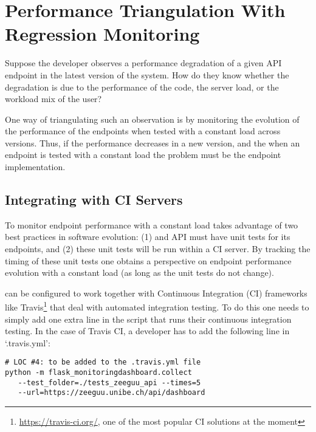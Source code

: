 


  \section{Performance Triangulation With Regression Monitoring}
  \label{sec:regression}

  Suppose the developer observes a performance degradation of a given API endpoint in the latest version of the system. How do they know whether the degradation is due to the performance of the code, the server load, or the workload mix of the user? 

  \vspace{0.1cm}

  
  One way of triangulating such an observation is by monitoring the evolution of the performance of the endpoints when tested with a constant load across versions. Thus, if the performance decreases in a new version, and the  when an endpoint is tested with a constant load the problem must be the endpoint implementation. 

  \subsection*{Integrating with CI Servers}

  To monitor endpoint performance with a constant load \tool takes advantage of two best practices in software evolution: (1) and API must have unit tests for its endpoints, and (2) these unit tests will be run within a CI server. By tracking the timing of these unit tests one obtains a perspective on endpoint performance evolution with a constant load (as long as the unit tests do not change). 

  \tool can be configured to work together with Continuous Integration (CI) frameworks like Travis\footnote{\url{https://travis-ci.org/}, one of the most popular CI solutions at the moment} that deal with automated integration testing. To do this one needs to simply add one extra line in the script that runs their continuous integration testing. In the case of Travis CI, a developer has to add the following line in `.travis.yml': 


  \begin{lstlisting}[style=custompython]  
# LOC #4: to be added to the .travis.yml file
python -m flask_monitoringdashboard.collect
   --test_folder=./tests_zeeguu_api --times=5 
   --url=https://zeeguu.unibe.ch/api/dashboard

  \end{lstlisting}

